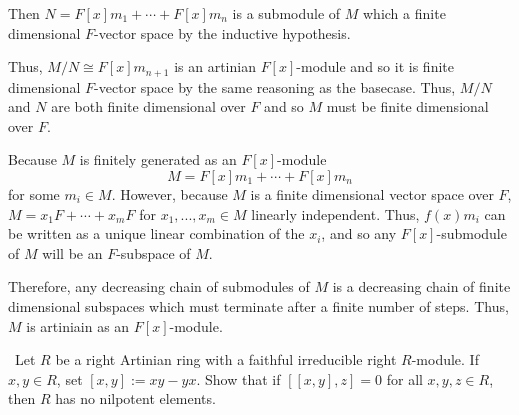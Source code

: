 \documentclass[12pt]{AlgebraQual}
\begin{document}
\begin{solution}
Then $N=F[x]m_1+\cdots+F[x]m_n$ is a submodule of $M$ which a finite dimensional $F$-vector space by the inductive hypothesis.

Thus, $M/N\cong F[x]m_{n+1}$ is an artinian $F[x]$-module and so it is finite dimensional $F$-vector space by the same reasoning as the basecase. Thus, $M/N$ and $N$ are both finite dimensional over $F$ and so $M$ must be finite dimensional over $F$.

\boxed{\impliedby} Because $M$ is finitely generated as an $F[x]$-module $$M=F[x]m_1+\cdots+F[x]m_n$$ for some $m_i\in M.$ However, because $M$ is a finite dimensional vector space over $F$, $M=x_1F+\cdots+x_mF$ for $x_1,...,x_m\in M$ linearly independent. Thus, $f(x)m_i$ can be written as a unique linear combination of the $x_i$, and so any $F[x]$-submodule of $M$ will be an $F$-subspace of $M.$

Therefore, any decreasing chain of submodules of $M$ is a decreasing chain of finite dimensional subspaces which must terminate after a finite number of steps. Thus, $M$ is artiniain as an $F[x]$-module.

\end{solution}
\newpage



\begin{problem} $\,$
Let $R$ be a right Artinian ring with a faithful irreducible right $R$-module. If $x,y\in R$, set $[x,y]:=xy-yx$. Show that if $[[x,y],z]=0$ for all $x,y,z\in R$, then $R$ has no nilpotent elements.
\end{problem}
\end{document}
